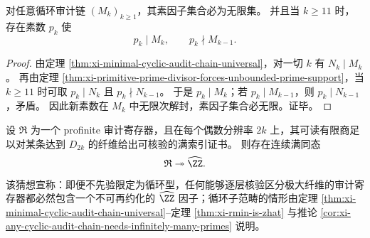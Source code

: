 \begin{corollary}[任意循环审计链不可能由有限素数集支撑]\label{cor:xi-any-cyclic-audit-chain-needs-infinitely-many-primes}
对任意循环审计链 \((M_k)_{k\ge 1}\)，其素因子集合必为无限集。
并且当 \(k\ge 11\) 时，存在素数 \(p_k\) 使
\[
p_k\mid M_k,\qquad p_k\nmid M_{k-1}.
\]
\end{corollary}
\begin{proof}
由定理 \ref{thm:xi-minimal-cyclic-audit-chain-universal}，对一切 \(k\) 有 \(N_k\mid M_k\)。
再由定理 \ref{thm:xi-primitive-prime-divisor-forces-unbounded-prime-support}，当 \(k\ge 11\) 时可取 \(p_k\mid N_k\) 且 \(p_k\nmid N_{k-1}\)。
于是 \(p_k\mid M_k\)；若 \(p_k\mid M_{k-1}\)，则 \(p_k\mid N_{k-1}\)，矛盾。
因此新素数在 \(M_k\) 中无限次解封，素因子集合必无限。证毕。
\end{proof}

\begin{conjecture}\label{conj:xi-zhat-as-irreducible-prime-audit-kernel}
设 \(\mathfrak R\) 为一个 profinite 审计寄存器，且在每个偶数分辨率 \(2k\) 上，其可读有限商足以对某条达到 \(D_{2k}\) 的纤维给出可核验的满索引证书。
则存在连续满同态
\[
\mathfrak R\twoheadrightarrow \widehat{\ZZ}.
\]
该猜想宣称：即便不先验限定为循环型，任何能够逐层核验区分极大纤维的审计寄存器都必然包含一个不可再约化的 \(\widehat{\ZZ}\) 因子；循环子范畴的情形由定理 \ref{thm:xi-minimal-cyclic-audit-chain-universal}--定理 \ref{thm:xi-rmin-is-zhat} 与推论 \ref{cor:xi-any-cyclic-audit-chain-needs-infinitely-many-primes} 说明。
\end{conjecture}

\endinput
